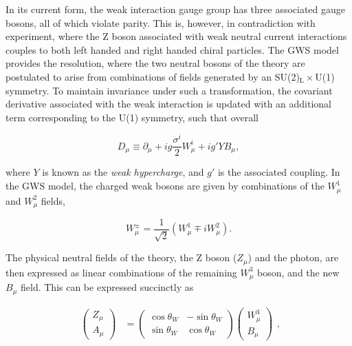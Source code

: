 In its current form, the weak interaction gauge group has three associated gauge bosons, all of which violate parity. This is, however, in contradiction with experiment, where the ${\mathrm{Z}}$ boson associated with weak neutral current interactions couples to both left handed and right handed chiral particles. The GWS model provides the resolution, where the two neutral bosons of the theory are postulated to arise from combinations of fields generated by an SU(2)${_{\mathrm{L}}\times}$U(1) symmetry. To maintain invariance under such a transformation, the covariant derivative associated with the weak interaction is updated with an additional term corresponding to the U(1) symmetry, such that overall

\begin{equation}
\label{eqn:ew_covariant_derivative}
    D_\mu \equiv \partial_\mu + ig\frac{\sigma^{i}}{2}W_{\mu}^{i} + ig'YB_{\mu},
\end{equation}

\noindent where ${Y}$ is known as the \textit{weak hypercharge}, and ${g'}$ is the associated coupling. In the GWS model, the charged weak bosons are given by combinations of the ${W^{1}_{\mu}}$ and ${W^{2}_{\mu}}$ fields,

\begin{equation}
     W^{\pm}_\mu = \frac{1}{\sqrt{2}}(W_\mu^1 \mp iW_\mu^2).
\end{equation}

\noindent The physical neutral fields of the theory, the ${\mathrm{Z}}$ boson (${Z_{\mu}}$) and the photon, are then expressed as linear combinations of the remaining ${W^{3}_{\mu}}$ boson, and the new ${B_\mu}$ field. This can be expressed succinctly as

\begin{equation}
\label{eqn:Z_photon_rotation_matrix}
\begin{split}
    \begin{pmatrix}
    Z_\mu \\
    A_\mu
    \end{pmatrix} 
    &= 
    \begin{pmatrix}
    \cos{\theta_W} & -\sin{\theta_W} \\
    \sin{\theta_W} & \cos{\theta_W}
    \end{pmatrix} 
    \begin{pmatrix}
    W^3_\mu \\
    B_\mu
    \end{pmatrix}
\end{split}
,
\end{equation}

